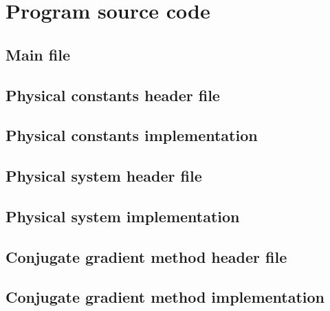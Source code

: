 \chapter{Program source code}
\label{ap:source_code}
\small
\section{Main file}



\section{Physical constants header file}



\section{Physical constants implementation}



\section{Physical system header file}



\section{Physical system implementation}



\section{Conjugate gradient method header file}



\section{Conjugate gradient method implementation}




